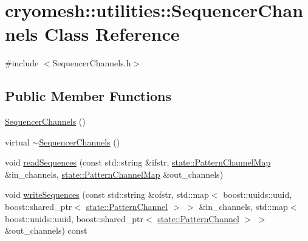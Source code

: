 \hypertarget{classcryomesh_1_1utilities_1_1SequencerChannels}{\section{cryomesh\-:\-:utilities\-:\-:\-Sequencer\-Channels \-Class \-Reference}
\label{classcryomesh_1_1utilities_1_1SequencerChannels}
}


{\ttfamily \#include $<$\-Sequencer\-Channels.\-h$>$}

\subsection*{\-Public \-Member \-Functions}
\begin{DoxyCompactItemize}
\item 
\hyperlink{classcryomesh_1_1utilities_1_1SequencerChannels_a4658cf722fba08c77ed35501fa21c82e}{\-Sequencer\-Channels} ()
\item 
virtual \hyperlink{classcryomesh_1_1utilities_1_1SequencerChannels_af20240b8b2119bf87b578243826d2926}{$\sim$\-Sequencer\-Channels} ()
\item 
void \hyperlink{classcryomesh_1_1utilities_1_1SequencerChannels_a2099c0ea6a68acda477034425c0d599c}{read\-Sequences} (const std\-::string \&ifstr, \hyperlink{classcryomesh_1_1state_1_1PatternChannelMap}{state\-::\-Pattern\-Channel\-Map} \&in\-\_\-channels, \hyperlink{classcryomesh_1_1state_1_1PatternChannelMap}{state\-::\-Pattern\-Channel\-Map} \&out\-\_\-channels)
\item 
void \hyperlink{classcryomesh_1_1utilities_1_1SequencerChannels_ab976bca72ec9b8206cc4a64529606ca8}{write\-Sequences} (const std\-::string \&ofstr, std\-::map$<$ boost\-::uuids\-::uuid, boost\-::shared\-\_\-ptr$<$ \hyperlink{classcryomesh_1_1state_1_1PatternChannel}{state\-::\-Pattern\-Channel} $>$ $>$ \&in\-\_\-channels, std\-::map$<$ boost\-::uuids\-::uuid, boost\-::shared\-\_\-ptr$<$ \hyperlink{classcryomesh_1_1state_1_1PatternChannel}{state\-::\-Pattern\-Channel} $>$ $>$ \&out\-\_\-channels) const 
\end{DoxyCompactItemize}
